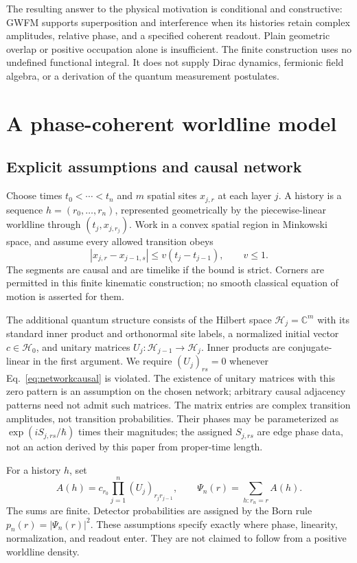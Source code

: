 \documentclass[aip,jmp,reprint,onecolumn,amsmath,amssymb]{revtex4-2}
\theoremstyle{definition}
\begin{document}
The resulting answer to the physical motivation is conditional and constructive: GWFM supports superposition and interference when its histories retain complex amplitudes, relative phase, and a specified coherent readout. Plain geometric overlap or positive occupation alone is insufficient. The finite construction uses no undefined functional integral. It does not supply Dirac dynamics, fermionic field algebra, or a derivation of the quantum measurement postulates.

\section{A phase-coherent worldline model}
\label{sec:coherent}
\subsection{Explicit assumptions and causal network}
Choose times $t_0<\cdots<t_n$ and $m$ spatial sites $x_{j,r}$ at each layer $j$. A history is a sequence $h=(r_0,\ldots,r_n)$, represented geometrically by the piecewise-linear worldline through $(t_j,x_{j,r_j})$. Work in a convex spatial region in Minkowski space, and assume every allowed transition obeys
\begin{equation}
 |x_{j,r}-x_{j-1,s}|\le v(t_j-t_{j-1}),\qquad v\le1.
 \label{eq:networkcausal}
\end{equation}
The segments are causal and are timelike if the bound is strict. Corners are permitted in this finite kinematic construction; no smooth classical equation of motion is asserted for them.

The additional quantum structure consists of the Hilbert space $\mathcal H_j=\mathbb C^m$ with its standard inner product and orthonormal site labels, a normalized initial vector $c\in\mathcal H_0$, and unitary matrices $U_j:\mathcal H_{j-1}\to\mathcal H_j$. Inner products are conjugate-linear in the first argument. We require $(U_j)_{rs}=0$ whenever Eq.~\eqref{eq:networkcausal} is violated. The existence of unitary matrices with this zero pattern is an assumption on the chosen network; arbitrary causal adjacency patterns need not admit such matrices. The matrix entries are complex transition amplitudes, not transition probabilities. Their phases may be parameterized as $\exp(iS_{j,rs}/\hbar)$ times their magnitudes; the assigned $S_{j,rs}$ are edge phase data, not an action derived by this paper from proper-time length.

For a history $h$, set
\begin{equation}
 A(h)=c_{r_0}\prod_{j=1}^n(U_j)_{r_jr_{j-1}},\qquad
 \Psi_n(r)=\sum_{h:r_n=r}A(h).
 \label{eq:history}
\end{equation}
The sums are finite. Detector probabilities are assigned by the Born rule $p_n(r)=|\Psi_n(r)|^2$. These assumptions specify exactly where phase, linearity, normalization, and readout enter. They are not claimed to follow from a positive worldline density.
\end{document}
